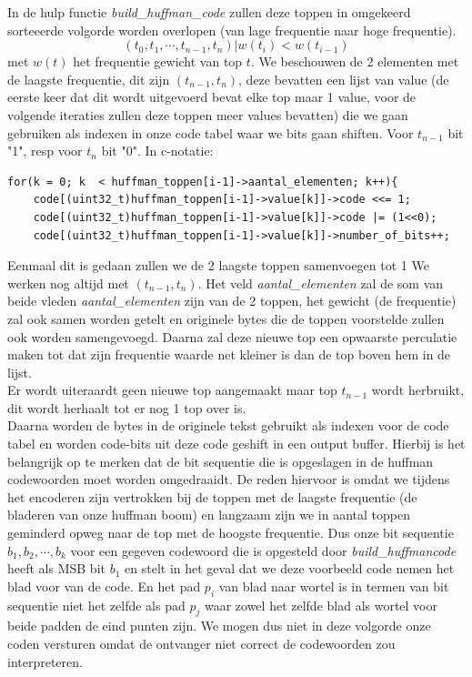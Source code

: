 \documentclass[10pt,a4paper]{report}
\begin{document}
In de hulp functie \emph{build\_huffman\_code} zullen deze toppen in omgekeerd sorteeerde volgorde worden overlopen (van lage frequentie naar hoge frequentie). 
$$(t_{0},t_{1},\cdots,t_{n-1},t_{n}) | w(t_{i}) < w(t_{i-1})$$
met $w(t)$ het frequentie gewicht van top $t$. We beschouwen de 2 elementen met de laagste frequentie, dit zijn $(t_{n-1},t_{n})$, deze bevatten een lijst van value (de eerste keer dat dit wordt uitgevoerd bevat elke top maar 1 value, voor de volgende iteraties zullen deze toppen meer values bevatten) die we gaan gebruiken als indexen in onze code tabel waar we bits gaan shiften. Voor $t_{n-1}$ bit "1", resp voor $t_{n}$ bit "0". In c-notatie:
\begin{lstlisting}
for(k = 0; k  < huffman_toppen[i-1]->aantal_elementen; k++){       
	code[(uint32_t)huffman_toppen[i-1]->value[k]]->code <<= 1; 
	code[(uint32_t)huffman_toppen[i-1]->value[k]]->code |= (1<<0);
	code[(uint32_t)huffman_toppen[i-1]->value[k]]->number_of_bits++;
\end{lstlisting}

Eenmaal dit is gedaan zullen we de 2 laagste toppen samenvoegen tot 1
We werken nog altijd met $(t_{n-1},t_{n})$. Het veld \emph{aantal\_elementen} zal de som van beide vleden \emph{aantal\_elementen} zijn van de 2 toppen, het gewicht (de frequentie) zal ook samen worden getelt en originele bytes die de toppen voorstelde zullen ook worden samengevoegd. Daarna zal deze nieuwe top een opwaarste perculatie maken tot dat zijn frequentie waarde net kleiner is dan de top boven hem in de lijst.\\

Er wordt uiteraardt geen nieuwe top aangemaakt maar top $t_{n-1}$ wordt herbruikt, dit wordt herhaalt tot er nog 1 top over is. \\

Daarna worden de bytes in de originele tekst gebruikt als indexen voor de code tabel en worden code-bits uit deze code geshift in een output buffer. Hierbij is het belangrijk op te merken dat de bit sequentie die is opgeslagen in de huffman codewoorden moet worden omgedraaidt. De reden hiervoor is omdat we tijdens het encoderen zijn vertrokken bij de toppen met de laagste frequentie (de bladeren van onze huffman boom) en langzaam zijn we in aantal toppen geminderd opweg naar de top met de hoogste frequentie. Dus onze bit sequentie $b_{1},b_{2},\cdots,b_{k}$ voor een gegeven codewoord die is opgesteld door \emph{build\_huffmancode} heeft als MSB bit $b_{1}$ en stelt in het geval dat we deze voorbeeld code nemen het blad voor van de code. En het pad $p_{i}$ van blad naar wortel is in termen van bit sequentie niet het zelfde als pad $p_{j}$ waar zowel het zelfde blad als wortel voor beide padden de eind punten zijn. We mogen dus niet in deze volgorde onze coden versturen omdat de ontvanger niet correct de codewoorden zou interpreteren. \\
\end{document}
